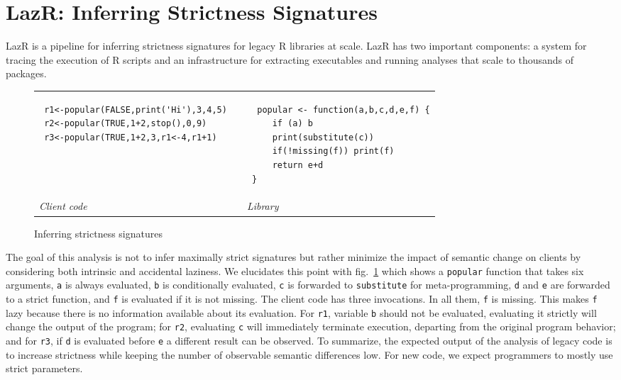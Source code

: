 \documentclass[review,creen,acmsmall]{acmart}
\renewcommand{\c}[1]{\lstinline |#1|\xspace}
\newcommand{\lazr}{{\sf LazR}\xspace}
\begin{document}
\section{LazR: Inferring Strictness Signatures}\label{sec:lazr}

\lazr is a pipeline for inferring strictness signatures for legacy R libraries
at scale. \lazr has two important components: a system for tracing the execution
of R scripts and an infrastructure for extracting executables and running
analyses that scale to thousands of packages.

\begin{figure}[!h]
  \begin{tabular}{lll}
    \begin{minipage}{6cm}
\begin{lstlisting}
 r1<-popular(FALSE,print('Hi'),3,4,5)
 r2<-popular(TRUE,1+2,stop(),0,9)
 r3<-popular(TRUE,1+2,3,r1<-4,r1+1)
\end{lstlisting}
    \end{minipage}
    &&
       \begin{minipage}{6cm}
\begin{lstlisting}
  popular <- function(a,b,c,d,e,f) {
     if (a) b
     print(substitute(c))
     if(!missing(f)) print(f)
     return e+d
 }
\end{lstlisting}
       \end{minipage}\\
    \it Client code&& \it Library
  \end{tabular}%
  \caption{Inferring strictness signatures}\label{iss} %
\end{figure}

The goal of this analysis is not to infer maximally strict signatures but rather
minimize the impact of semantic change on clients by considering both intrinsic
and accidental laziness. We elucidates this point with fig.~\ref{iss} which
shows a \c{popular} function that takes six arguments, \c{a} is always
evaluated, \c{b} is conditionally evaluated, \c{c} is forwarded to
\c{substitute} for meta-programming, \c{d} and \c{e} are forwarded to a
strict function, and \c{f} is evaluated if it is not missing. The client code
has three invocations. In all them, \c{f} is missing. This makes \c{f}
lazy because there is no information available about its evaluation. For \c{r1},
variable \c b should not be evaluated, evaluating it strictly will change the
output of the program; for \c{r2}, evaluating \c{c} will immediately
terminate execution, departing from the original program behavior; and for
\c{r3}, if \c{d} is evaluated before \c{e} a different result can be observed.
To summarize, the expected output of the analysis of legacy code is to increase
strictness while keeping the number of observable semantic differences low. For
new code, we expect programmers to mostly use strict parameters.
\end{document}
